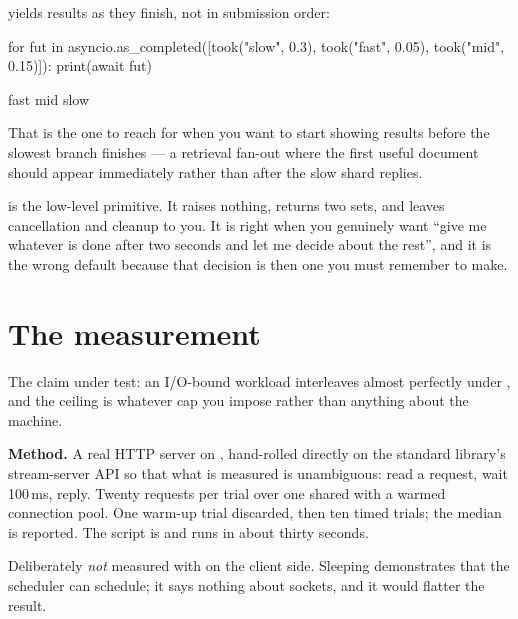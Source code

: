  yields results as they finish, not in submission order:

\begin{python}[caption={Completion order, not submission order}, label={lst:as-completed}]
for fut in asyncio.as_completed([took("slow", 0.3), took("fast", 0.05),
                                 took("mid", 0.15)]):
    print(await fut)
\end{python}

\begin{console}
fast
mid
slow
\end{console}

That is the one to reach for when you want to start showing results before the
slowest branch finishes --- a retrieval fan-out where the first useful document
should appear immediately rather than after the slow shard replies.

 is the low-level primitive. It raises nothing, returns two sets, and
leaves cancellation and cleanup to you. It is right when you genuinely want
``give me whatever is done after two seconds and let me decide about the rest'',
and it is the wrong default because that decision is then one you must remember
to make.

\section{The measurement}
\label{sec:measurement}

The claim under test: an I/O-bound workload interleaves almost perfectly under
, and the ceiling is whatever cap you impose rather than anything
about the machine.

\textbf{Method.} A real HTTP server on , hand-rolled directly on
the standard library's stream-server API so that what is measured is
unambiguous: read a request, wait 100\,ms, reply. Twenty requests per trial over
one shared  with a warmed connection pool. One warm-up
trial discarded, then ten timed trials; the median is reported. The script is
 and runs in about thirty seconds.

Deliberately \emph{not} measured with  on the client side.
Sleeping demonstrates that the scheduler can schedule; it says nothing about
sockets, and it would flatter the result.

